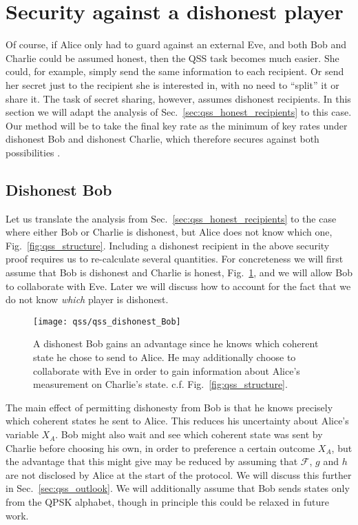 \section{Security against a dishonest player}\label{sec:qss_dishonest_recipient}
Of course, if Alice only had to guard against an external Eve, and both Bob and Charlie could be assumed honest, then the QSS task becomes much easier. She could, for example, simply send the same information to each recipient. Or send her secret just to the recipient she is interested in, with no need to ``split'' it or share it. The task of secret sharing, however, assumes dishonest recipients. In this section we will adapt the analysis of Sec.~\ref{sec:qss_honest_recipients} to this case. Our method will be to take the final key rate as the minimum of key rates under dishonest Bob and dishonest Charlie, which therefore secures against both possibilities \cite{Kogias2017, Grice2019}. %

\subsection{Dishonest Bob}
Let us translate the analysis from Sec.~\ref{sec:qss_honest_recipients} to the case where either Bob or Charlie is dishonest, but Alice does not know which one, Fig.~\ref{fig:qss_structure}. Including a dishonest recipient in the above security proof requires us to re-calculate several quantities. For concreteness we will first assume that Bob is dishonest and Charlie is honest, Fig.~\ref{fig:qss_dishonest_Bob}, and we will allow Bob to collaborate with Eve. Later we will discuss how to account for the fact that we do not know \emph{which} player is dishonest.

\begin{figure}[htp]
\captionsetup{width=0.8\linewidth}
\centering
\texttt{[image: qss/qss\_dishonest\_Bob]}
\caption{\label{fig:qss_dishonest_Bob} A dishonest Bob gains an advantage since he knows which coherent state he chose to send to Alice. He may additionally choose to collaborate with Eve in order to gain information about Alice's measurement on Charlie's state. c.f. Fig.~\ref{fig:qss_structure}.}
\end{figure}

The main effect of permitting dishonesty from Bob is that he knows precisely which coherent states he sent to Alice. This reduces his uncertainty about Alice's variable $X_A$. Bob might also wait and see which coherent state was sent by Charlie before choosing his own, in order to preference a certain outcome $X_A$, but the advantage that this might give may be reduced by assuming that $\mathcal{F}$, $g$ and $h$ are not disclosed by Alice at the start of the protocol. We will discuss this further in Sec.~\ref{sec:qss_outlook}. We will additionally assume that Bob sends states only from the QPSK alphabet, though in principle this could be relaxed in future work.

